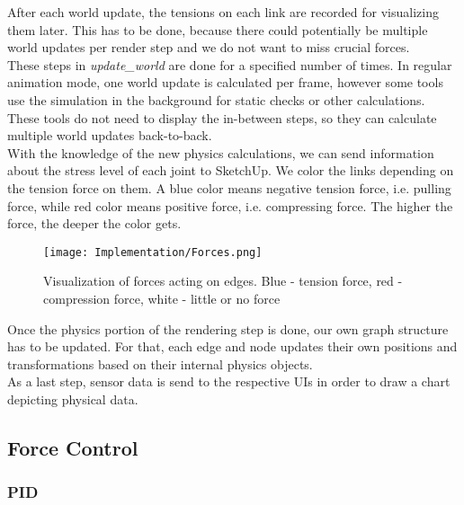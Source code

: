 After each world update, the tensions on each link are recorded for visualizing them later. This has to be done, because there could potentially be multiple world updates per render step and we do not want to miss crucial forces.\\
These steps in \textit{update\_world} are done for a specified number of times. In regular animation mode, one world update is calculated per frame, however some tools use the simulation in the background for static checks or other calculations. These tools do not need to display the in-between steps, so they can calculate multiple world updates back-to-back.\\
With the knowledge of the new physics calculations, we can send information about the stress level of each joint to SketchUp. We color the links depending on the tension force on them. A blue color means negative tension force, i.e. pulling force, while red color means positive force, i.e. compressing force. The higher the force, the deeper the color gets.\\
\begin{figure}[h!]
    \texttt{[image: Implementation/Forces.png]}
    \centering
    \caption{Visualization of forces acting on edges. Blue - tension force, red - compression force, white - little or no force}
    \label{fig:force_visualization}
\end{figure}
Once the physics portion of the rendering step is done, our own graph structure has to be updated. For that, each edge and node updates their own positions and transformations based on their internal physics objects.\\
As a last step, sensor data is send to the respective UIs in order to draw a chart depicting physical data.

\subsection{Force Control}

\subsubsection{PID}\label{sec:pid}


